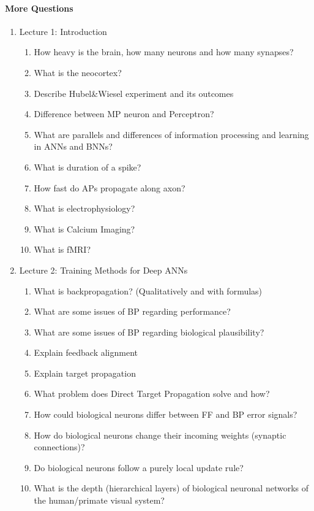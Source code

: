 \documentclass[main]{subfiles}
\begin{document}
\paragraph{More Questions}

\begin{enumerate}
    \item{Lecture 1: Introduction}
    \begin{enumerate}[label*=\arabic*.]
        \item How heavy is the brain, how many neurons and how many synapses?
        \item What is the neocortex?
        \item Describe Hubel\&Wiesel experiment and its outcomes
        \item Difference between MP neuron and Perceptron?
        \item What are parallels and differences of information processing and learning in ANNs and BNNs?
        \item What is duration of a spike? 
        \item How fast do APs propagate along axon?
        \item What is electrophysiology?
        \item What is Calcium Imaging?
        \item What is fMRI?
    \end{enumerate}
    
    \item{Lecture 2: Training Methods for Deep ANNs}
    \begin{enumerate}[label*=\arabic*.]
        \item What is backpropagation? (Qualitatively and with formulas)
        \item What are some issues of BP regarding performance?
        \item What are some issues of BP regarding biological plausibility?
        \item Explain feedback alignment
        \item Explain target propagation
        \item What problem does Direct Target Propagation solve and how?
        \item How could biological neurons differ between FF and BP error signals?
        \item How do biological neurons change their incoming weights (synaptic connections)?
        \item Do biological neurons follow a purely local update rule?
        \item What is the depth (hierarchical layers) of biological neuronal networks of the human/primate visual system?
    \end{enumerate}
    

\end{enumerate}
\end{document}
